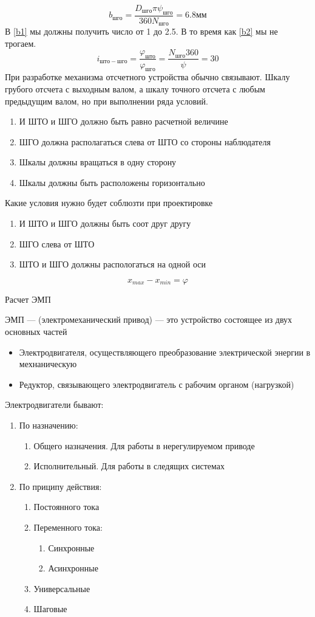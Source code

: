 \documentclass{article}
\begin{document}
\begin{enumerate}
\begin{enumerate}
		$$\label{b2}
		b_{шго} = \frac{D_{шго} \pi \psi_{шго}}{360 N_{шго}} = 6.8 мм
		$$
		В \ref{b1} мы должны получить число от 1 до 2.5. В то время как \ref{b2} мы не трогаем.
		$$
		i_{што-шго} = \frac{\varphi_{што}}{\varphi_{шго}} = \frac{N_{шго} 360}{ \psi}  = 30
		$$
		При разработке механизма отсчетного устройства обычно связывают. Шкалу грубого отсчета с выходным валом, а шкалу точного отсчета с любым предыдущим валом, но при выполнении ряда условий.
		\begin{enumerate}
			\item И ШТО и ШГО должно быть равно расчетной величине
			\item ШГО должна располагаться слева от ШТО со стороны наблюдателя
			\item Шкалы должны вращаться в одну сторону
			\item Шкалы должны быть расположены горизонтально
		\end{enumerate}
		Какие условия нужно будет соблюзти при проектировке
		\begin{enumerate}
			\item И ШТО и ШГО должны быть соот друг другу
			\item ШГО слева от ШТО
			\item ШТО и ШГО должны распологаться на одной оси
		\end{enumerate}
		$$
		x_{max} - x_{min} = \varphi
		$$
	\end{enumerate}
\end{enumerate}

Расчет ЭМП

ЭМП --- (электромеханический привод) --- это устройство состоящее из двух основных частей%
\begin{itemize}
	\item Электродвигателя, осуществляющего преобразование электрической энергии в мехнаническую
	\item Редуктор, связывающего электродвигатель с рабочим органом (нагрузкой)
\end{itemize}

Электродвигатели бывают:
\begin{enumerate}
	\item По назначению:
	\begin{enumerate}
		\item Общего назначения. Для работы в нерегулируемом приводе
		\item Исполнительный. Для работы в следящих системах
	\end{enumerate}
	\item По приципу действия:
	\begin{enumerate}
		\item Постоянного тока
		\item Переменного тока:
		\begin{enumerate}
			\item Синхронные
			\item Асинхронные
		\end{enumerate}
		\item Универсальные
		\item Шаговые
	\end{enumerate}
\end{enumerate}
\end{document}
